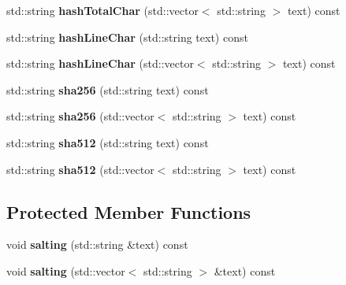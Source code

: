 \begin{DoxyCompactItemize}
\item 
\hypertarget{classstb_1_1Hasher_a18c431b9426b2b1af5f76eb69e0924bb}{std\+::string {\bfseries hash\+Total\+Char} (std\+::vector$<$ std\+::string $>$ text) const }\label{classstb_1_1Hasher_a18c431b9426b2b1af5f76eb69e0924bb}

\item 
\hypertarget{classstb_1_1Hasher_a213b645fb9b7b47fa6df0dce835a4cff}{std\+::string {\bfseries hash\+Line\+Char} (std\+::string text) const }\label{classstb_1_1Hasher_a213b645fb9b7b47fa6df0dce835a4cff}

\item 
\hypertarget{classstb_1_1Hasher_a9180db366b49c484e27b4e3e309c4f4e}{std\+::string {\bfseries hash\+Line\+Char} (std\+::vector$<$ std\+::string $>$ text) const }\label{classstb_1_1Hasher_a9180db366b49c484e27b4e3e309c4f4e}

\item 
\hypertarget{classstb_1_1Hasher_a0e88113f09e22f2a8d839c975f2dc6fe}{std\+::string {\bfseries sha256} (std\+::string text) const }\label{classstb_1_1Hasher_a0e88113f09e22f2a8d839c975f2dc6fe}

\item 
\hypertarget{classstb_1_1Hasher_af62bdbde49bd502806c3a0f583191bf4}{std\+::string {\bfseries sha256} (std\+::vector$<$ std\+::string $>$ text) const }\label{classstb_1_1Hasher_af62bdbde49bd502806c3a0f583191bf4}

\item 
\hypertarget{classstb_1_1Hasher_af76b768afa271f71ef3862072678dffc}{std\+::string {\bfseries sha512} (std\+::string text) const }\label{classstb_1_1Hasher_af76b768afa271f71ef3862072678dffc}

\item 
\hypertarget{classstb_1_1Hasher_afcbd5c0c604c749d4a494d64ed26da57}{std\+::string {\bfseries sha512} (std\+::vector$<$ std\+::string $>$ text) const }\label{classstb_1_1Hasher_afcbd5c0c604c749d4a494d64ed26da57}

\end{DoxyCompactItemize}
\subsection*{Protected Member Functions}
\begin{DoxyCompactItemize}
\item 
\hypertarget{classstb_1_1Hasher_a9437388e93804ceec6ed5189d2e62ff5}{void {\bfseries salting} (std\+::string \&text) const }\label{classstb_1_1Hasher_a9437388e93804ceec6ed5189d2e62ff5}

\item 
\hypertarget{classstb_1_1Hasher_a031d8142ae973fcd72e409de9b193cdb}{void {\bfseries salting} (std\+::vector$<$ std\+::string $>$ \&text) const }\label{classstb_1_1Hasher_a031d8142ae973fcd72e409de9b193cdb}

\end{DoxyCompactItemize}
